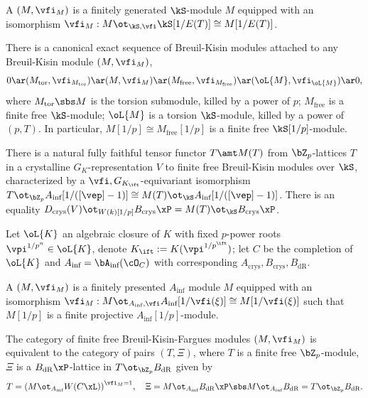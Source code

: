 \documentclass[a4paper, twoside]{article}
\begin{document}
\begin{dfn}
	A  $(M,\vfi_{M})$ is a finitely generated $\kS$-module $M$ equipped with an isomorphism $\vfi_{M}:M\ot_{\kS,\vfi}\kS[1/E(T)]\cong M[1/E(T)]$.

\end{dfn}

\begin{thm}
	There is a canonical exact sequence of Breuil-Kisin modules attached to any Breuil-Kisin module $(M,\vfi_{M})$,
	\[
		0\ar(M_{\text{tor}},\vfi_{M_{\text{tor}}})\ar(M,\vfi_{M})\ar(M_{\text{free}},\vfi_{M_{\text{free}}})\ar(\oL{M},\vfi_{\oL{M}})\ar0,
	\]
	where $M_{\text{tor}}\sbs M$ is the torsion submodule, killed by a power of $p$; $M_{\text{free}}$ is a finite free $\kS$-module; $\oL{M}$ is a torsion $\kS$-module, killed by a power of $(p,T)$. In particular, $M[1/p]\cong M_{\text{free}}[1/p]$ is a finite free $\kS[1/p]$-module.
\end{thm}

\begin{thm}
	There is a natural fully faithful tensor functor $T\amt M(T)$ from $\bZ_{p}$-lattices $T$ in a crystalline $G_{K}$-representation $V$ to finite free Breuil-Kisin modules over $\kS$, characterized by a $\vfi,G_{K_{\ift}}$-equivariant isomorphism $T\ot_{\bZ_{p}}A_{\text{inf}}[1/([\vep]-1)]\cong M(T)\ot_{\kS}A_{\text{inf}}[1/([\vep]-1)]$. There is an equality $D_{\text{crys}}(V)\ot_{W(k)[1/p]}B_{\text{crys}}\xP= M(T)\ot_{\kS}B_{\text{crys}}\xP$.
\end{thm}

\begin{stp}
	Let $\oL{K}$ an algebraic closure of $K$ with fixed $p$-power roots $\vpi^{1/p^{n}}\in\oL{K}$, denote $K_{\ift}:=K(\vpi^{1/p^{\ift}})$; let $C$ be the completion of $\oL{K}$ and $A_{\text{inf}}=\bA_{\text{inf}}(\cO_{C})$ with corresponding $A_{\text{crys}},B_{\text{crys}},B_{\text{dR}}$.
\end{stp}

\begin{dfn}
	A  $(M,\vfi_{M})$ is a finitely presented $A_{\text{inf}}$ module $M$ equipped with an isomorphism $\vfi_{M}:M\ot_{A_{\text{inf}},\vfi}A_{\text{inf}}[1/\vfi(\xi)]\cong M[1/\vfi(\xi)]$ such that $M[1/p]$ is a finite projective $A_{\text{inf}}[1/p]$-module.
\end{dfn}

\begin{thm}
	The category of finite free Breuil-Kisin-Fargues modules $(M,\vfi_{M})$ is equivalent to the category of pairs $(T,\Xi)$, where $T$ is a finite free $\bZ_{p}$-module, $\Xi$ is a $B_{\text{dR}}\xP$-lattice in $T\ot_{\bZ_{p}}B_{\text{dR}}$ given by
	\[
		T={(M\ot_{A_{\text{inf}}}W(C\xL))}^{\vfi_{M}=1},\quad \Xi=M\ot_{A_{\text{inf}}}B_{\text{dR}}\xP\sbs M\ot_{A_{\text{inf}}}B_{\text{dR}}=T\ot_{\bZ_{p}}B_{\text{dR}}.
	\]
\end{thm}
\end{document}
